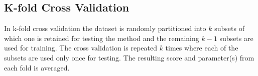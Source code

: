 \subsection{K-fold Cross Validation}\label{sec:kfoldxval}
%
 In k-fold cross validation the dataset is randomly partitioned into $k$ subsets of which one is retained for testing the method and the remaining $k-1$ subsets are used for training. The cross validation is repeated $k$ times where each of the subsets are used only once for testing. The resulting score and parameter(s) from each fold is averaged. %
%
%
